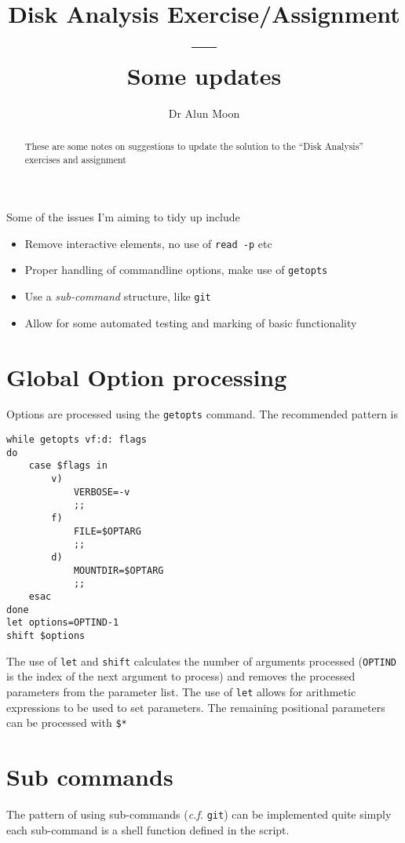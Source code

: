 \documentclass[12pt]{article}
\title{Disk Analysis Exercise/Assignment \\---\\ Some updates}
\author{Dr Alun Moon}
\begin{document}
\maketitle

\begin{abstract}
	These are some notes on suggestions to update the solution to the 
	``Disk Analysis'' exercises and assignment
\end{abstract}

Some of the issues I'm aiming to tidy up include
\begin{itemize}
	\item Remove interactive elements, no use of \verb:read -p: etc
	\item Proper handling of commandline options, make use of \verb:getopts:
	\item Use a \emph{sub-command} structure, like \verb:git:
	\item Allow for some automated testing and marking of basic functionality
\end{itemize}

\section{Global Option processing}
Options are processed using the \verb:getopts: command.  The recommended pattern is 
\begin{tcolorbox}[title=\texttt{getopts} handling]
\begin{verbatim}
while getopts vf:d: flags
do
    case $flags in
        v)
            VERBOSE=-v
            ;;
        f)
            FILE=$OPTARG
            ;;
        d)
            MOUNTDIR=$OPTARG
            ;;
    esac
done
let options=OPTIND-1
shift $options
\end{verbatim}
\end{tcolorbox}
The use of \verb:let: and \verb:shift: calculates the number of arguments processed 
(\verb:OPTIND: is the index of the next argument to process)
and removes the processed parameters from the parameter list.
The use of \verb:let: allows for arithmetic expressions to be used to set parameters.
The remaining positional parameters can be processed with \verb:$*:

\section{Sub commands}
The pattern of using sub-commands (\textit{c.f.} \verb:git:) can be implemented quite simply
each sub-command is a shell function defined in the script.
\end{document}
